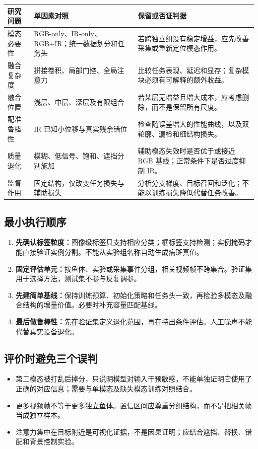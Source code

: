 \documentclass[UTF8,a4paper,11pt,fontset=windows]{ctexart}
\renewcommand{\arraystretch}{1.28}
\begin{document}
\begingroup\small\renewcommand{\arraystretch}{1.15}
\noindent\begin{tabularx}{\linewidth}{@{}L{2.2cm}YY@{}}
\toprule
研究问题 & 单因素对照 & 保留或否证判据\\
\midrule
模态必要性 & RGB-only、IR-only、RGB+IR；统一数据划分和任务头 & 若跨独立组没有稳定增益，应先改善采集或重新定位模态作用。\\
融合复杂度 & 拼接卷积、局部门控、全局注意力 & 比较任务表现、延迟和显存；复杂模块必须有可解释的额外收益。\\
融合位置 & 浅层、中层、深层及有限组合 & 若某层无增益且增大成本，应考虑删除，而不是保留所有尺度。\\
配准鲁棒性 & IR 已知小位移与真实残余错位 & 检查随误差增大的性能曲线，以及双轮廓、漏检和细结构损失。\\
质量退化 & 模糊、低信号、饱和、遮挡分别施加 & 辅助模态失效时是否优于或接近 RGB 基线；正常条件下是否过度抑制 IR。\\
监督作用 & 固定结构，仅改变任务损失与辅助损失 & 分析分支梯度、目标召回和泛化；不能以训练损失降低代替任务改善。\\
\bottomrule
\end{tabularx}
\endgroup

\subsection{最小执行顺序}
\begin{enumerate}
  \item \textbf{先确认标签粒度：}图像级标签只支持相应分类；框标签支持检测；实例掩码才能直接验证实例分割。不能从实验组名称自动生成病斑真值。
  \item \textbf{固定评估单元：}按鱼体、实验或采集事件分组，相关视频帧不跨集合。验证集用于选择方法，测试集不参与反复调参。
  \item \textbf{先建简单基线：}保持训练预算、初始化策略和任务头一致，再检验多模态及融合结构的增量价值。必要时补充容量匹配基线。
  \item \textbf{最后做鲁棒性：}先在验证集定义退化范围，再在持出条件评估。人工噪声不能代替真实设备退化。
\end{enumerate}

\subsection{评价时避免三个误判}
\begin{itemize}
  \item 第二模态被打乱后掉分，只说明模型对输入干预敏感，不能单独证明它使用了正确的对应信息；需要与单模态及缺失模态训练对照结合。
  \item 更多视频帧不等于更多独立鱼体。置信区间应尊重分组结构，而不是把相关帧当成独立样本。
  \item 注意力集中在目标附近是可视化证据，不是因果证明；应结合遮挡、替换、错配和背景控制实验。
\end{itemize}
\end{document}
